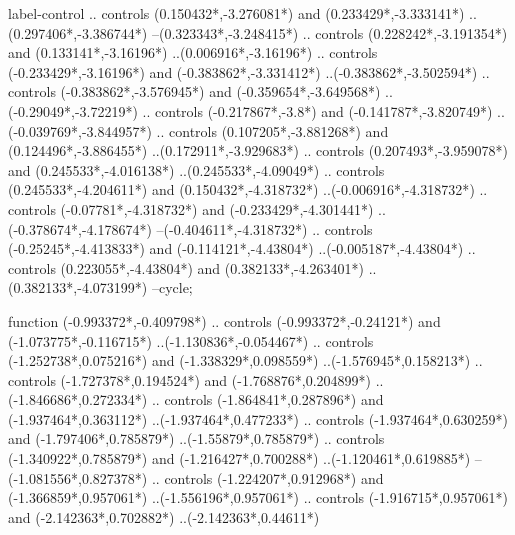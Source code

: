 {\begin{scope}[x=1mm,y=1mm,line width=\SCstroke mm,line cap=round,line join=round]
\begin{SCpart}{label-control}
.. controls ({0.150432*\SCF},{-3.276081*\SCF}) and ({0.233429*\SCF},{-3.333141*\SCF}) ..({0.297406*\SCF},{-3.386744*\SCF})
--({0.323343*\SCF},{-3.248415*\SCF})
.. controls ({0.228242*\SCF},{-3.191354*\SCF}) and ({0.133141*\SCF},{-3.16196*\SCF}) ..({0.006916*\SCF},{-3.16196*\SCF})
.. controls ({-0.233429*\SCF},{-3.16196*\SCF}) and ({-0.383862*\SCF},{-3.331412*\SCF}) ..({-0.383862*\SCF},{-3.502594*\SCF})
.. controls ({-0.383862*\SCF},{-3.576945*\SCF}) and ({-0.359654*\SCF},{-3.649568*\SCF}) ..({-0.29049*\SCF},{-3.72219*\SCF})
.. controls ({-0.217867*\SCF},{-3.8*\SCF}) and ({-0.141787*\SCF},{-3.820749*\SCF}) ..({-0.039769*\SCF},{-3.844957*\SCF})
.. controls ({0.107205*\SCF},{-3.881268*\SCF}) and ({0.124496*\SCF},{-3.886455*\SCF}) ..({0.172911*\SCF},{-3.929683*\SCF})
.. controls ({0.207493*\SCF},{-3.959078*\SCF}) and ({0.245533*\SCF},{-4.016138*\SCF}) ..({0.245533*\SCF},{-4.09049*\SCF})
.. controls ({0.245533*\SCF},{-4.204611*\SCF}) and ({0.150432*\SCF},{-4.318732*\SCF}) ..({-0.006916*\SCF},{-4.318732*\SCF})
.. controls ({-0.07781*\SCF},{-4.318732*\SCF}) and ({-0.233429*\SCF},{-4.301441*\SCF}) ..({-0.378674*\SCF},{-4.178674*\SCF})
--({-0.404611*\SCF},{-4.318732*\SCF})
.. controls ({-0.25245*\SCF},{-4.413833*\SCF}) and ({-0.114121*\SCF},{-4.43804*\SCF}) ..({-0.005187*\SCF},{-4.43804*\SCF})
.. controls ({0.223055*\SCF},{-4.43804*\SCF}) and ({0.382133*\SCF},{-4.263401*\SCF}) ..({0.382133*\SCF},{-4.073199*\SCF})
--cycle;
\end{SCpart}
\begin{SCpart}{function}
 ({-0.993372*\SCF},{-0.409798*\SCF})
.. controls ({-0.993372*\SCF},{-0.24121*\SCF}) and ({-1.073775*\SCF},{-0.116715*\SCF}) ..({-1.130836*\SCF},{-0.054467*\SCF})
.. controls ({-1.252738*\SCF},{0.075216*\SCF}) and ({-1.338329*\SCF},{0.098559*\SCF}) ..({-1.576945*\SCF},{0.158213*\SCF})
.. controls ({-1.727378*\SCF},{0.194524*\SCF}) and ({-1.768876*\SCF},{0.204899*\SCF}) ..({-1.846686*\SCF},{0.272334*\SCF})
.. controls ({-1.864841*\SCF},{0.287896*\SCF}) and ({-1.937464*\SCF},{0.363112*\SCF}) ..({-1.937464*\SCF},{0.477233*\SCF})
.. controls ({-1.937464*\SCF},{0.630259*\SCF}) and ({-1.797406*\SCF},{0.785879*\SCF}) ..({-1.55879*\SCF},{0.785879*\SCF})
.. controls ({-1.340922*\SCF},{0.785879*\SCF}) and ({-1.216427*\SCF},{0.700288*\SCF}) ..({-1.120461*\SCF},{0.619885*\SCF})
--({-1.081556*\SCF},{0.827378*\SCF})
.. controls ({-1.224207*\SCF},{0.912968*\SCF}) and ({-1.366859*\SCF},{0.957061*\SCF}) ..({-1.556196*\SCF},{0.957061*\SCF})
.. controls ({-1.916715*\SCF},{0.957061*\SCF}) and ({-2.142363*\SCF},{0.702882*\SCF}) ..({-2.142363*\SCF},{0.44611*\SCF})

\end{SCpart}
\end{scope}}
